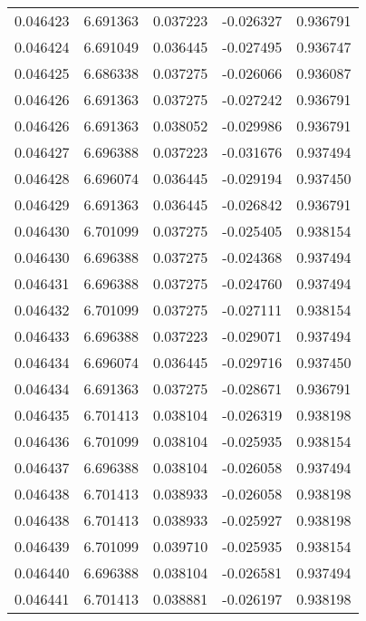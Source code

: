 \begin{tabular}{lrrrr}
0.046423    &  6.691363 &  0.037223 & -0.026327 &             0.936791 \\
0.046424    &  6.691049 &  0.036445 & -0.027495 &             0.936747 \\
0.046425    &  6.686338 &  0.037275 & -0.026066 &             0.936087 \\
0.046426    &  6.691363 &  0.037275 & -0.027242 &             0.936791 \\
0.046426    &  6.691363 &  0.038052 & -0.029986 &             0.936791 \\
0.046427    &  6.696388 &  0.037223 & -0.031676 &             0.937494 \\
0.046428    &  6.696074 &  0.036445 & -0.029194 &             0.937450 \\
0.046429    &  6.691363 &  0.036445 & -0.026842 &             0.936791 \\
0.046430    &  6.701099 &  0.037275 & -0.025405 &             0.938154 \\
0.046430    &  6.696388 &  0.037275 & -0.024368 &             0.937494 \\
0.046431    &  6.696388 &  0.037275 & -0.024760 &             0.937494 \\
0.046432    &  6.701099 &  0.037275 & -0.027111 &             0.938154 \\
0.046433    &  6.696388 &  0.037223 & -0.029071 &             0.937494 \\
0.046434    &  6.696074 &  0.036445 & -0.029716 &             0.937450 \\
0.046434    &  6.691363 &  0.037275 & -0.028671 &             0.936791 \\
0.046435    &  6.701413 &  0.038104 & -0.026319 &             0.938198 \\
0.046436    &  6.701099 &  0.038104 & -0.025935 &             0.938154 \\
0.046437    &  6.696388 &  0.038104 & -0.026058 &             0.937494 \\
0.046438    &  6.701413 &  0.038933 & -0.026058 &             0.938198 \\
0.046438    &  6.701413 &  0.038933 & -0.025927 &             0.938198 \\
0.046439    &  6.701099 &  0.039710 & -0.025935 &             0.938154 \\
0.046440    &  6.696388 &  0.038104 & -0.026581 &             0.937494 \\
0.046441    &  6.701413 &  0.038881 & -0.026197 &             0.938198 \\

\end{tabular}
